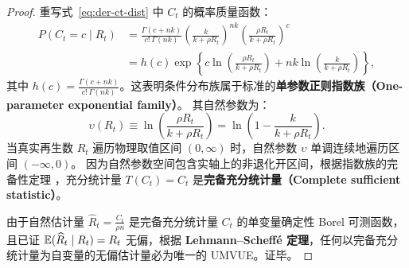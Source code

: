 \begin{proof}
重写式~\eqref{eq:der-ct-dist} 中 $C_t$ 的概率质量函数：
\begin{align}
  P(C_t = c \mid R_t) &= \frac{\Gamma(c + nk)}{c! \, \Gamma(nk)} \left( \frac{k}{k + \rho R_t} \right)^{nk} \left( \frac{\rho R_t}{k + \rho R_t} \right)^c \nonumber \\
  &= h(c) \exp\left\{ c \ln\left( \frac{\rho R_t}{k + \rho R_t} \right) + nk \ln\left( \frac{k}{k + \rho R_t} \right) \right\},
\end{align}
其中 $h(c) = \frac{\Gamma(c+nk)}{c!\,\Gamma(nk)}$。这表明条件分布族属于标准的\textbf{单参数正则指数族（One-parameter exponential family）}。
其自然参数为：
\begin{equation}
  \upsilon(R_t) \equiv \ln\left( \frac{\rho R_t}{k + \rho R_t} \right) = \ln\left( 1 - \frac{k}{k + \rho R_t} \right).
\end{equation}
当真实再生数 $R_t$ 遍历物理取值区间 $(0, \infty)$ 时，自然参数 $\upsilon$ 单调连续地遍历区间 $(-\infty, 0)$。
因为自然参数空间包含实轴上的非退化开区间，根据指数族的完备性定理 \citep{lehmann2005testing}，充分统计量 $T(C_t) = C_t$ 是\textbf{完备充分统计量（Complete sufficient statistic）}。

由于自然估计量 $\widehat{R}_t = \frac{C_t}{\rho n}$ 是完备充分统计量 $C_t$ 的单变量确定性 Borel 可测函数，且已证 $\mathbb{E}(\widehat{R}_t \mid R_t) = R_t$ 无偏，根据 \textbf{Lehmann--Scheffé 定理}，任何以完备充分统计量为自变量的无偏估计量必为唯一的 UMVUE。证毕。
\end{proof}
